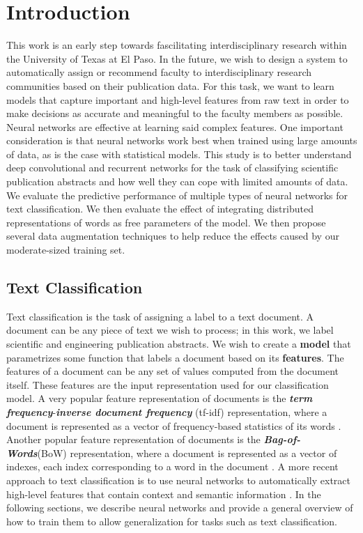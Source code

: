 
\chapter{Introduction}
This work is an early step towards fascilitating interdisciplinary research within the University of Texas at El Paso.
In the future, we wish to design a system to automatically assign or recommend faculty to
interdisciplinary research communities based on their publication data. For this task, we want to learn models that capture
important and high-level features from raw text in order to make decisions as accurate and meaningful to the faculty members as possible.
Neural networks are effective at learning said complex features. One important consideration is that neural networks work best when trained
using large amounts of data, as is the case with statistical models.
This study is to better understand deep convolutional and recurrent networks for the task of classifying scientific publication abstracts and how
well they can cope with limited amounts of data. We evaluate the predictive performance of multiple types of neural networks for text classification.
We then evaluate the effect of integrating distributed representations of words as free parameters of the model. We then propose several data augmentation techniques to help reduce the effects caused by our
moderate-sized training set.

\section{Text Classification}
Text classification is the task of assigning a label to a text document. A document can be any piece of text we wish to process; in this
work, we label scientific and engineering publication abstracts. We wish to create a \textbf{model} that parametrizes
some function that labels a document based on its \textbf{features}. The features of a document can be any set of values
computed from the document itself. These features are the input representation used for our classification model. A very popular feature representation of documents is the
\textit{\textbf{term frequency}}-\textit{\textbf{inverse document frequency}} (tf-idf) representation, where a document is represented as a vector of frequency-based statistics of its words \cite{luhn1957statistical}.
Another popular feature representation of documents is the \textit{\textbf{Bag-of-Words}}(BoW) representation, where a document is represented as a vector of indexes,
each index corresponding to a word in the document \cite{joachims2002learning}. A more recent approach to text classification is to use neural networks to automatically
extract high-level features that contain context and semantic information \cite{johnson2014effective}\cite{graves2013speech}. In the following sections, we
describe neural networks and provide a general overview of how to train them to allow generalization for tasks such as text classification.



